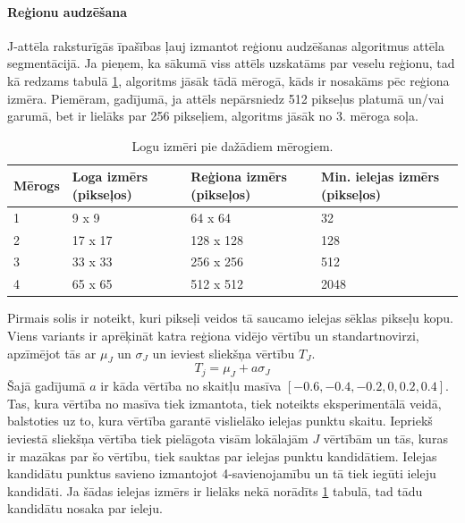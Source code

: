 \documentclass[12pt,paper=a4]{report}
\begin{document}
\paragraph{Reģionu audzēšana}J-attēla raksturīgās īpašības ļauj izmantot reģionu audzēšanas algoritmus attēla segmentācijā. Ja pieņem, ka sākumā viss attēls uzskatāms par veselu reģionu, tad kā redzams tabulā \ref{tab:logiUnMerogi}, algoritms jāsāk tādā mērogā, kāds ir nosakāms pēc reģiona izmēra. Piemēram, gadījumā, ja attēls nepārsniedz 512 pikseļus platumā un/vai garumā, bet ir lielāks par 256 pikseļiem, algoritms jāsāk no 3. mēroga soļa. \cite{2unsupImSegm2001}\par
\begin{table}[!ht]
\centering
\caption{Logu izmēri pie dažādiem mērogiem.}
\label{tab:logiUnMerogi}
\begin{tabular}{|p{1.5cm}|p{3.8cm}|p{3.8cm}|p{3.8cm}|}
\hline
Mērogs&Loga izmērs (pikseļos)&Reģiona izmērs (pikseļos)&Min. ielejas izmērs (pikseļos)\\ \hline \hline
1&9 x 9&64 x 64&32 \\ \hline
2&17 x 17&128 x 128&128 \\ \hline
3&33 x 33&256 x 256&512 \\ \hline
4&65 x 65&512 x 512&2048 \\ \hline
\end{tabular}
\end{table}
Pirmais solis ir noteikt, kuri pikseļi veidos tā saucamo ielejas sēklas pikseļu kopu. Viens variants ir aprēķināt katra reģiona vidējo vērtību un standartnovirzi, apzīmējot tās ar $\mu_J$ un $\sigma_J$ un ieviest sliekšņa vērtību $T_J$. 
\begin{equation}
T_j=\mu_J+a \sigma_J
\end{equation}
Šajā gadījumā $a$ ir kāda vērtība no skaitļu masīva $[-0.6, -0.4, -0.2, 0, 0.2, 0.4]$. Tas, kura vērtība no masīva tiek izmantota, tiek noteikts eksperimentālā veidā, balstoties uz to, kura vērtība garantē vislielāko ielejas punktu skaitu. Iepriekš ieviestā sliekšņa vērtība tiek pielāgota visām lokālajām $J$ vērtībām un tās, kuras ir mazākas par šo vērtību, tiek sauktas par ielejas punktu kandidātiem. Ielejas kandidātu punktus savieno izmantojot 4-savienojamību un tā tiek iegūti ieleju kandidāti. Ja šādas ielejas izmērs ir lielāks nekā norādīts \ref{tab:logiUnMerogi} tabulā, tad tādu kandidātu nosaka par ieleju. \cite{1colImSegm1999}\par
\end{document}
